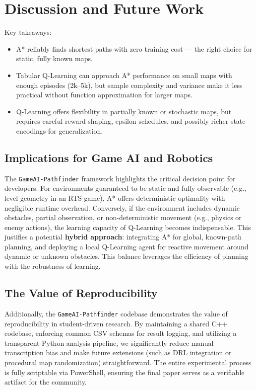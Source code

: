 \documentclass[conference]{IEEEtran}
\begin{document}
	\section{Discussion and Future Work}
	Key takeaways:
	\begin{itemize}
		\item A* reliably finds shortest paths with zero training cost --- the right choice for static, fully known maps.
		\item Tabular Q-Learning can approach A* performance on small maps with enough episodes (2k--5k), but sample complexity and variance make it less practical without function approximation for larger maps.
		\item Q-Learning offers flexibility in partially known or stochastic maps, but requires careful reward shaping, epsilon schedules, and possibly richer state encodings for generalization.
	\end{itemize}
	
	\subsection{Implications for Game AI and Robotics}
	The \texttt{GameAI-Pathfinder} framework highlights the critical decision point for developers. For environments guaranteed to be static and fully observable (e.g., level geometry in an RTS game), A* offers deterministic optimality with negligible runtime overhead. Conversely, if the environment includes dynamic obstacles, partial observation, or non-deterministic movement (e.g., physics or enemy actions), the learning capacity of Q-Learning becomes indispensable. This justifies a potential \textbf{hybrid approach}: integrating A* for global, known-path planning, and deploying a local Q-Learning agent for reactive movement around dynamic or unknown obstacles. This balance leverages the efficiency of planning with the robustness of learning.
	
	\subsection{The Value of Reproducibility}
	Additionally, the \texttt{GameAI-Pathfinder} codebase demonstrates the value of reproducibility in student-driven research. By maintaining a shared C++ codebase, enforcing common CSV schemas for result logging, and utilizing a transparent Python analysis pipeline, we significantly reduce manual transcription bias and make future extensions (such as DRL integration or procedural map randomization) straightforward. The entire experimental process is fully scriptable via PowerShell, ensuring the final paper serves as a verifiable artifact for the community.
	
\end{document}

